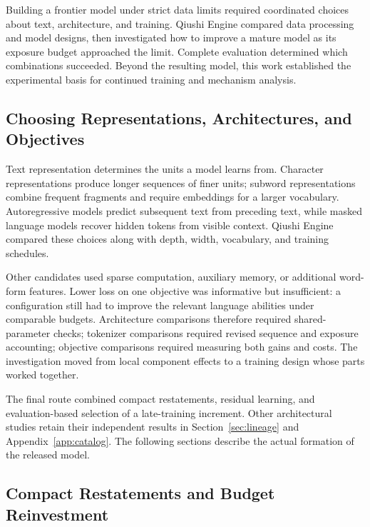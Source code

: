 \label{sec:frontier}

Building a frontier model under strict data limits required coordinated choices about text, architecture, and training. Qiushi Engine compared data processing and model designs, then investigated how to improve a mature model as its exposure budget approached the limit. Complete evaluation determined which combinations succeeded. Beyond the resulting model, this work established the experimental basis for continued training and mechanism analysis.

\subsection{Choosing Representations, Architectures, and Objectives}

Text representation determines the units a model learns from. Character representations produce longer sequences of finer units; subword representations combine frequent fragments and require embeddings for a larger vocabulary. Autoregressive models predict subsequent text from preceding text, while masked language models recover hidden tokens from visible context. Qiushi Engine compared these choices along with depth, width, vocabulary, and training schedules.

Other candidates used sparse computation, auxiliary memory, or additional word-form features. Lower loss on one objective was informative but insufficient: a configuration still had to improve the relevant language abilities under comparable budgets. Architecture comparisons therefore required shared-parameter checks; tokenizer comparisons required revised sequence and exposure accounting; objective comparisons required measuring both gains and costs. The investigation moved from local component effects to a training design whose parts worked together.

The final route combined compact restatements, residual learning, and evaluation-based selection of a late-training increment. Other architectural studies retain their independent results in Section~\ref{sec:lineage} and Appendix~\ref{app:catalog}. The following sections describe the actual formation of the released model.

\subsection{Compact Restatements and Budget Reinvestment}

